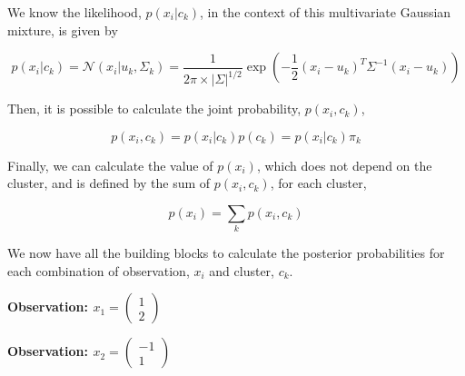 \documentclass[12pt]{article}
\begin{document}
\begin{enumerate}[leftmargin=\labelsep]
          We know the likelihood, $p(x_i|c_k)$, in the context of this multivariate Gaussian mixture, is given by

          \begin{equation}\label{ex1-likelihood}
              p(x_i|c_k) = \mathcal{N}(x_i|u_{k}, \Sigma_{k})
              = \frac{1}{2\pi \times |\varSigma|^{1/2}}
              \exp\left(-\frac{1}{2} \left(x_i - u_k\right)^T \varSigma^{-1}\left(x_i - u_k\right)\right)
          \end{equation}

          Then, it is possible to calculate the joint probability, $p(x_i, c_k)$,

          \begin{equation}\label{ex1-joint}
              p(x_i,c_k) = p(x_i|c_k)p(c_k) = p(x_i|c_k) \pi_k
          \end{equation}

          Finally, we can calculate the value of $p(x_i)$, which does not depend
          on the cluster, and is defined by the sum of $p(x_i, c_k)$, for each cluster,

          \begin{equation}\label{ex1-sum-joint}
              p(x_i) = \sum_k p(x_i, c_k)
          \end{equation}

          We now have all the building blocks to calculate the posterior probabilities
          for each combination of observation, $x_i$ and cluster, $c_k$.

          \vspace*{0.5cm}

          \begin{paracol}{3}
              \begin{center}
                  \textbf{Observation: \textcolor{cred}{$x_1 = \begin{pmatrix}
                                  1 \\
                                  2
                              \end{pmatrix}$}}
              \end{center}

              \switchcolumn

              \begin{center}
                  \textbf{Observation: \textcolor{cblue}{$x_2 = \begin{pmatrix}
                                  -1 \\
                                  1
                              \end{pmatrix}$}}
              \end{center}


\end{paracol}
\end{enumerate}
\end{document}
